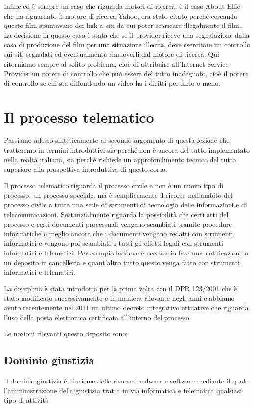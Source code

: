 Infine ed è sempre un caso che riguarda motori di ricerca, è il caso About Ellie che ha riguardato il motore di ricerca Yahoo, era stato citato perché cercando questo film spuntavano dei link a siti da cui poter scaricare illegalmente il film. La decisione in questo caso è stata che se il provider riceve una segnalazione dalla casa di produzione del film per una situazione illecita, deve esercitare un controllo sui siti segnalati ed eventualmente rimuoverli dal motore di ricerca. 
Qui ritorniamo sempre al solito problema, cioè di attribuire all'Internet Service Provider un potere di controllo che può essere del tutto inadeguato, cioè il potere di controllo se chi sta diffondendo un video ha i diritti per farlo o meno. 

\section{Il processo telematico}
Passiamo adesso sinteticamente al secondo argomento di questa lezione che tratteremo in termini introduttivi sia perché non è ancora del tutto implementato nella realtà italiana, sia perché richiede un approfondimento tecnico del tutto superiore alla prospettiva introduttiva di questo corso.

Il processo telematico riguarda il processo civile e non è un nuovo tipo di processo, un processo speciale, ma è semplicemente il ricorso nell'ambito del processo civile a tutta una serie di strumenti di tecnologia delle informazioni e di telecomunicazioni. Sostanzialmente riguarda la possibilità che certi atti del processo e certi documenti processuali vengano scambiati tramite procedure informatiche o meglio ancora che i documenti vengano redatti con strumenti informatici e vengono poi scambiati a tutti gli effetti legali con strumenti informatici e telematici.  Per esempio laddove è necessario fare una notificazione o un deposito in cancelleria e quant'altro tutto questo venga fatto con strumenti informatici e telematici. 

La disciplina è stata introdotta per la prima volta con il DPR 123/2001 che è stato modificato successivamente e in maniera rilevante negli anni e abbiamo avuto recentemente nel 2011 un ultimo decreto integrativo attuativo che riguarda l'uso della posta elettronica certificata all'interno del processo. 

Le nozioni rilevanti questo deposito sono:

\subsection{Dominio giustizia}
Il dominio giustizia è l'insieme delle risorse hardware e software mediante il quale l'amministrazione della giustizia tratta in via informatica e telematica qualsiasi tipo di attività

